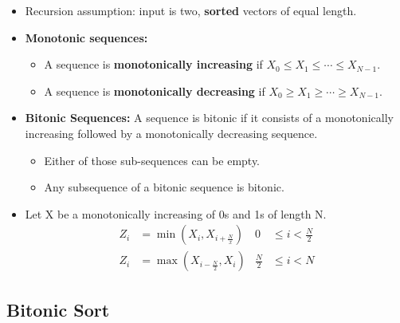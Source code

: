 \documentclass[../main.tex]{subfiles}
\begin{document}
\begin{itemize}
	\item Recursion assumption: input is two, \textbf{sorted} vectors of equal length.
	\item \textbf{Monotonic sequences:}
	      \begin{itemize}
		      \item A sequence is \textbf{monotonically increasing} if \(X_0 \leq X_1 \leq \cdots \leq X_{N-1}\).
		      \item A sequence is \textbf{monotonically decreasing} if \(X_0 \geq X_1 \geq \cdots \geq X_{N-1}\).
	      \end{itemize}
	\item \textbf{Bitonic Sequences:} A sequence is bitonic if it consists of a monotonically increasing followed by a monotonically decreasing sequence.
	      \begin{itemize}
		      \item Either of those sub-sequences can be empty.
		      \item Any subsequence of a bitonic sequence is bitonic.
	      \end{itemize}
	\item Let X be a monotonically increasing of 0s and 1s of length N.
	      \begin{align*}
		      Z_i & = \min(X_i, X_{i+\frac{N}{x}}) & 0           & \leq i < \frac{N}{2} \\
		      Z_i & = \max(X_{i-\frac{N}{2}}, X_i) & \frac{N}{2} & \leq i < N
	      \end{align*}
\end{itemize}

\subsection{Bitonic Sort}
\end{document}
